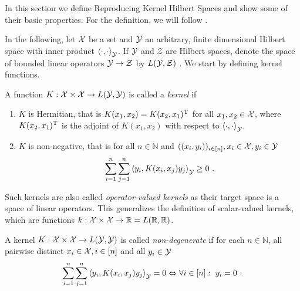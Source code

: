 In this section we define Reproducing Kernel Hilbert Spaces and show some of their basic properties.
For the definition, we will follow \cite{owhadi20}.


In the following, let $\mathcal{X}$ be a set and $\mathcal{Y}$ an arbitrary, finite dimensional Hilbert space with inner product $\left<\cdot, \cdot \right>_{\mathcal{Y}}$.
If $\mathcal{Y}$ and $\mathcal{Z}$ are Hilbert spaces, denote the space of bounded linear operators $\mathcal{Y} \rightarrow \mathcal{Z}$ by $L(\mathcal{Y}, \mathcal{Z})$ .
We start by defining kernel functions.
\begin{definition}
	\label{def:kernel}
	A function $K: \mathcal{X} \times \mathcal{X} \rightarrow L(\mathcal{Y}, \mathcal{Y})$ is called a \emph{kernel} if
	\begin{enumerate}
		\item $K$ is Hermitian, that is $K(x_1, x_2) = K(x_2, x_1)^{\mathrm{T}}$ for all $x_1, x_2 \in \mathcal{X}$, where $K(x_2, x_1)^{\mathrm{T}}$ is the adjoint of $K(x_1, x_2)$ with respect to $\left<\cdot, \cdot\right>_{\mathcal{Y}}$.
		\item $K$ is non-negative, that is for all $n \in \mathbb{N}$ and $((x_i, y_i))_{i \in [n]}, x_i \in \mathcal{X}, y_i \in \mathcal{Y}$
		\begin{equation}
			\sum_{i=1}^n \sum_{j=1}^n \left< y_i, K(x_i, x_j)  y_j\right>_\cY \geq 0 \ .
		\end{equation}
	\end{enumerate}
\end{definition}

Such kernels are also called \emph{operator-valued kernels} as their target space is a space of linear operators.
This generalizes the definition of scalar-valued kernels, which are functions $k: \mathcal{X} \times \mathcal{X} \rightarrow \mathbb{R} = L(\mathbb{R} ,\mathbb{R})$.

\begin{definition}
	A kernel $K: \mathcal{X} \times \mathcal{X} \rightarrow L(\mathcal{Y}, \mathcal{Y})$ is called \emph{non-degenerate} if for each $n \in \mathbb{N}$, all pairwise distinct $x_i \in \mathcal{X}, i \in [n]$ and all $y_i \in \mathcal{Y}$
	\begin{equation}
		\sum_{i=1}^n \sum_{j=1}^n \left< y_i, K(x_i, x_j)  y_j\right>_{\mathcal{Y}} = 0 \Leftrightarrow \forall i \in [n]:~ y_i = 0 \ .
	\end{equation}
\end{definition}

